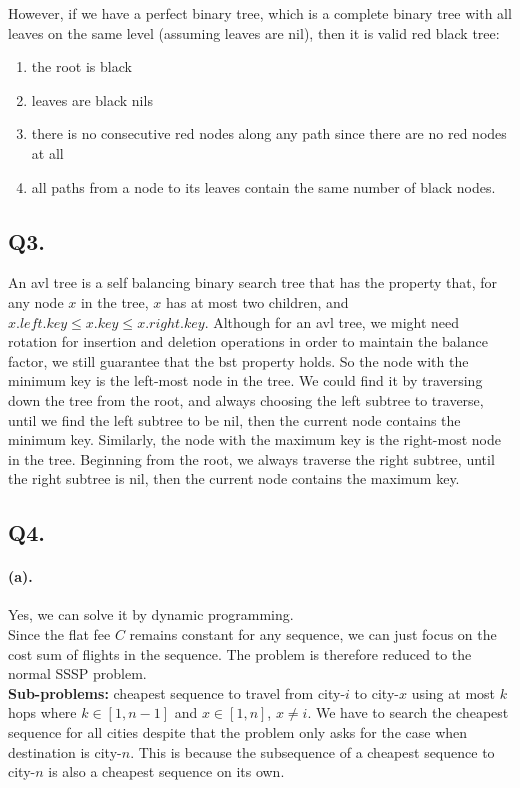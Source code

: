 \documentclass[12pt]{article}
\begin{document}
\noindent However, if we have a perfect binary tree, which is a complete binary tree with all leaves on the same level (assuming leaves are nil), then it is valid red black tree:
     \begin{enumerate}
          \setlength \itemsep{0em} 
          \item the root is black
          \item leaves are black nils
          \item there is no consecutive red nodes along any path since there are no red nodes at all
          \item all paths from a node to its leaves contain the same number of black nodes.
     \end{enumerate}

\subsection*{Q3.}
An avl tree is a self balancing binary search tree that has the property that, for any node \(x\) in the tree, \(x\) has at most two children, and \(x.left.key \leq x.key \leq x.right.key\). Although for an avl tree, we might need rotation for insertion and deletion operations in order to maintain the balance factor, we still guarantee that the bst property holds. So the node with the minimum key is the left-most node in the tree. We could find it by traversing down the tree from the root, and always choosing the left subtree to traverse, until we find the left subtree to be nil, then the current node contains the minimum key. Similarly, the node with the maximum key is the right-most node in the tree. Beginning from the root, we always traverse the right subtree, until the right subtree is nil, then the current node contains the maximum key. 

\subsection*{Q4.}
\paragraph{(a).} Yes, we can solve it by dynamic programming.\\ 
Since the flat fee \(C\) remains constant for any sequence, we can just focus on the cost sum of flights in the sequence. The problem is therefore reduced to the normal SSSP problem.\\
\textbf{Sub-problems:} cheapest sequence to travel from city-\(i\) to city-\(x\) using at most \(k\) hops where \(k \in [1, n-1]\) and \(x \in [1, n]\), \(x \neq i\). We have to search the cheapest sequence for all cities despite that the problem only asks for the case when destination is city-\(n\). This is because the subsequence of a cheapest sequence to city-\(n\) is also a cheapest sequence on its own.
\end{document}
